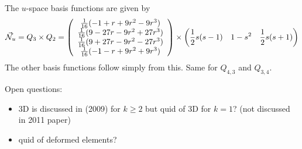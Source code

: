 The $u$-space basis functions are given by 
\[
\vec{{\mathcal{N}}}_u = Q_3 \times Q_2 =
\left(
\begin{array}{c}
\frac{1}{16} (-1+  r+9r^2- 9r^3 ) \\
\frac{1}{16} ( 9-27r-9r^2+27r^3 ) \\
\frac{1}{16} ( 9+27r-9r^2-27r^3 ) \\
\frac{1}{16} (-1-  r+9r^2+ 9r^3 ) 
\end{array}
\right)
\times
\left(
\frac12 s(s-1)  \quad
1-s^2 \quad
\frac12 s(s+1)
\right)
\]
The other basis functions follow simply from this. Same for $Q_{4,3}$ and $Q_{3,4}$.


Open questions:
\begin{itemize}
\item 3D is discussed in \cite{zhan09} (2009) for $k\ge 2$ but quid of 3D for $k=1$? (not discussed in 2011 paper) 
\item quid of deformed elements?
\end{itemize}




